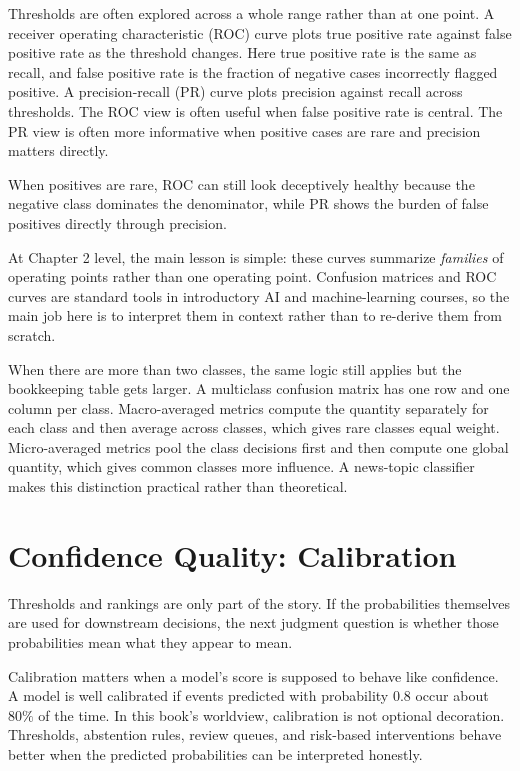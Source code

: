 Thresholds are often explored across a whole range rather than at one point. A receiver operating characteristic (ROC) curve plots true positive rate against false positive rate as the threshold changes. Here true positive rate is the same as recall, and false positive rate is the fraction of negative cases incorrectly flagged positive. A precision-recall (PR) curve plots precision against recall across thresholds. The ROC view is often useful when false positive rate is central. The PR view is often more informative when positive cases are rare and precision matters directly.

When positives are rare, ROC can still look deceptively healthy because the negative class dominates the denominator, while PR shows the burden of false positives directly through precision.

At Chapter 2 level, the main lesson is simple: these curves summarize \emph{families} of operating points rather than one operating point. Confusion matrices and ROC curves are standard tools in introductory AI and machine-learning courses, so the main job here is to interpret them in context rather than to re-derive them from scratch.

\begin{advancednote}
When there are more than two classes, the same logic still applies but the bookkeeping table gets larger. A multiclass confusion matrix has one row and one column per class. Macro-averaged metrics compute the quantity separately for each class and then average across classes, which gives rare classes equal weight. Micro-averaged metrics pool the class decisions first and then compute one global quantity, which gives common classes more influence. A news-topic classifier makes this distinction practical rather than theoretical.
\end{advancednote}

\section{Confidence Quality: Calibration}

Thresholds and rankings are only part of the story. If the probabilities themselves are used for downstream decisions, the next judgment question is whether those probabilities mean what they appear to mean.

Calibration matters when a model's score is supposed to behave like confidence. A model is well calibrated if events predicted with probability $0.8$ occur about $80\%$ of the time. In this book's worldview, calibration is not optional decoration. Thresholds, abstention rules, review queues, and risk-based interventions behave better when the predicted probabilities can be interpreted honestly.

